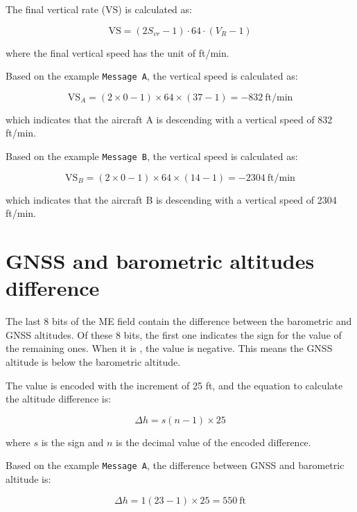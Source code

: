 The final vertical rate ($\mathrm{VS}$) is calculated as:

\begin{equation}
  \mathrm{VS} = (2S_{vr} - 1) \cdot 64 \cdot (V_R - 1)
\end{equation}

where the final vertical speed has the unit of ft/min.

Based on the example \texttt{Message A}, the vertical speed is calculated as:

\begin{equation}
  \mathrm{VS}_A = (2 \times 0 - 1) \times 64 \times (37 -1) = -832 ~\text{ft/min}
\end{equation}

which indicates that the aircraft A is descending with a vertical speed of 832 ft/min.

Based on the example \texttt{Message B}, the vertical speed is calculated as:

\begin{equation}
  \mathrm{VS}_B = (2 \times 0 - 1) \times 64 \times (14 -1) = -2304 ~\text{ft/min}
\end{equation}

which indicates that the aircraft B is descending with a vertical speed of 2304 ft/min.


\section{GNSS and barometric altitudes difference}

The last 8 bits of the ME field contain the difference between the barometric and GNSS altitudes. Of these 8 bits, the first one indicates the sign for the value of the remaining ones. When it is \1, the value is negative. This means the GNSS altitude is below the barometric altitude.

The value is encoded with the increment of 25 ft, and the equation to calculate the altitude difference is:

\begin{equation}
  \Delta h = s (n - 1) \times 25
\end{equation}

where $s$ is the sign and $n$ is the decimal value of the encoded difference.

Based on the example \texttt{Message A}, the difference between GNSS and barometric altitude is:

\begin{equation}
  \Delta h = 1 (23 - 1) \times 25 = 550 ~\text{ft}
\end{equation}

